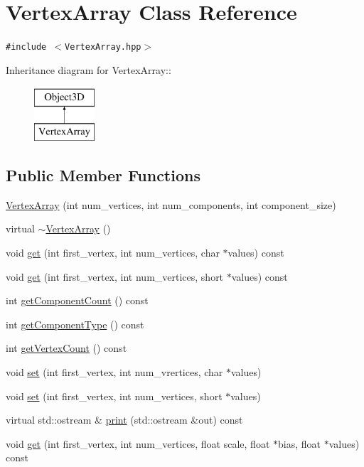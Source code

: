 \hypertarget{classm3g_1_1VertexArray}{
\section{VertexArray Class Reference}
\label{classm3g_1_1VertexArray}
}
{\tt \#include $<$VertexArray.hpp$>$}

Inheritance diagram for VertexArray::\begin{figure}[H]
\begin{center}
\leavevmode
\includegraphics[height=2cm]{classm3g_1_1VertexArray}
\end{center}
\end{figure}
\subsection*{Public Member Functions}
\begin{CompactItemize}
\item 
\hyperlink{classm3g_1_1VertexArray_5f38e30d23b5dc34b223e749e8afd0d0}{VertexArray} (int num\_\-vertices, int num\_\-components, int component\_\-size)
\item 
virtual \hyperlink{classm3g_1_1VertexArray_267fa63cb2f4216729437dc826415911}{$\sim$VertexArray} ()
\item 
void \hyperlink{classm3g_1_1VertexArray_9d1b801a7c196a07553a5ef4a5473573}{get} (int first\_\-vertex, int num\_\-vertices, char $\ast$values) const 
\item 
void \hyperlink{classm3g_1_1VertexArray_575822f60d7b5e74ed51e94851123038}{get} (int first\_\-vertex, int num\_\-vertices, short $\ast$values) const 
\item 
int \hyperlink{classm3g_1_1VertexArray_7016f51d2788e78fdd736efd040f5e5e}{getComponentCount} () const 
\item 
int \hyperlink{classm3g_1_1VertexArray_9b7b78fbff0603779ec6bdd2a323c939}{getComponentType} () const 
\item 
int \hyperlink{classm3g_1_1VertexArray_c1c9b7f5b0dcd9c0310d7e77e10081ba}{getVertexCount} () const 
\item 
void \hyperlink{classm3g_1_1VertexArray_31bc745ba40cc25ac73b6b391751fe51}{set} (int first\_\-vertex, int num\_\-vrertices, char $\ast$values)
\item 
void \hyperlink{classm3g_1_1VertexArray_ac10afe01263d9ac5e7f972a7263de4a}{set} (int first\_\-vertex, int num\_\-vertices, short $\ast$values)
\item 
virtual std::ostream \& \hyperlink{classm3g_1_1VertexArray_6fea17fa1532df3794f8cb39cb4f911f}{print} (std::ostream \&out) const 
\item 
void \hyperlink{classm3g_1_1VertexArray_1adedf59e0c6a047242a3914ca52b929}{get} (int first\_\-vertex, int num\_\-vertices, float scale, float $\ast$bias, float $\ast$values) const 
\end{CompactItemize}
